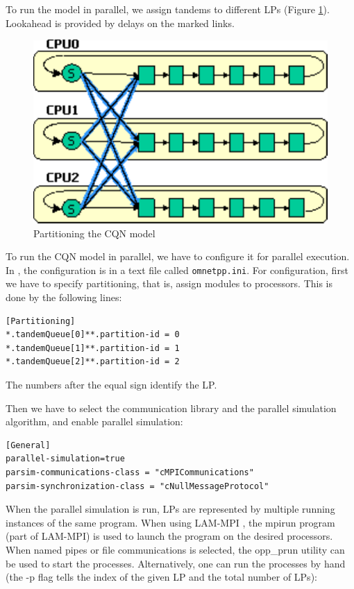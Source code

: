 To run the model in parallel, we assign tandems to different LPs
(Figure \ref{fig:cqn-partitioning}). Lookahead is provided
by delays on the marked links.

\begin{figure}[htbp]
  \begin{center}
    \includegraphics{figures/cqn-partitioning}
    \caption{Partitioning the CQN model}
    \label{fig:cqn-partitioning}
  \end{center}
\end{figure}

To run the CQN model in parallel, we have to configure it for parallel
execution. In {\opp}, the configuration is in a text file called
\texttt{omnetpp.ini}. For configuration, first we have to specify
partitioning, that is, assign modules to processors. This is done
by the following lines:

\begin{verbatim}
[Partitioning]
*.tandemQueue[0]**.partition-id = 0
*.tandemQueue[1]**.partition-id = 1
*.tandemQueue[2]**.partition-id = 2
\end{verbatim}

The numbers after the equal sign identify the LP.

Then we have to select the communication library and the parallel
simulation algorithm, and enable parallel simulation:

\begin{verbatim}
[General]
parallel-simulation=true
parsim-communications-class = "cMPICommunications"
parsim-synchronization-class = "cNullMessageProtocol"
\end{verbatim}

When the parallel simulation is run, LPs are represented
by multiple running instances of the same program.
When using LAM-MPI \cite{lammpi}, the mpirun program (part of LAM-MPI)
is used to launch the program on the desired processors.
When named pipes or file communications is selected, the opp\_prun
{\opp} utility can be used to start the processes.
Alternatively, one can run the processes by hand (the -p flag
tells {\opp} the index of the given LP and the total number of LPs):

